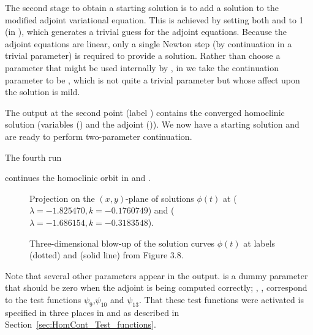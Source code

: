\documentclass[12pt]{report}
\begin{document}
The second stage to obtain a starting solution 
is to add a solution to the modified adjoint
variational equation. This is achieved by setting both 
 and  to 1 (in ), which generates
a trivial guess for the adjoint equations. Because the adjoint
equations are linear, only a single
Newton step (by continuation in a trivial parameter) 
is required to provide a solution.
Rather than choose a parameter that might be used internally
by \AUTO, in  we take the continuation parameter
to be , which is not quite a trivial parameter
but whose affect upon the solution is mild.
\begin{center}
\end{center}
The output at the second point (label ) 
contains the converged homoclinic
solution (variables () and the adjoint ()). We now have a starting solution 
and are ready to perform two-parameter continuation.

The fourth run
\begin{center}
\end{center}
continues the homoclinic orbit in  and . 
%
\begin{figure}[p]
\epsfysize 9.0cm
\centerline{}
\caption{Projection on the $(x,y)$-plane of solutions $\phi(t)$
at  ($\lambda=-1.825470, k=-0.1760749$) and
 ($\lambda=-1.686154, k=-0.3183548$).}
\label{kf.2a}
\end{figure}
\begin{figure}[p]
\epsfysize 8.0cm
\centerline{}
\caption{Three-dimensional blow-up of the solution curves
 $\phi(t)$ 
at labels  (dotted) and  (solid line) from Figure 3.8.}
\label{kf.2b}
\end{figure}
%
Note that several other parameters appear in
the output.  is a dummy parameter
that should be zero when the adjoint is being computed correctly;
, ,  correspond to the
test functions $\psi_9$,$\psi_{10}$ and $\psi_{13}$. 
That these test functions were activated is specified
in three places in  and  
as described in Section~\ref{sec:HomCont_Test_functions}.  
\end{document}
